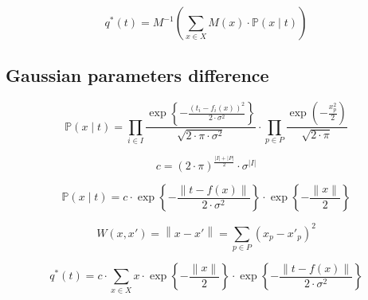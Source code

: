\begin{equation*}
  q^* \left( t \right)
  = M^{-1} \left(
      \sum_{x \in X} M\left( x \right) \cdot \mathbb{P}\left( x \mid t \right)
    \right)
\end{equation*}

\subsection{Gaussian parameters difference}

\begin{equation*}
  \mathbb{P}\left( x \mid t \right)
  = \prod_{i \in I}
    \frac{\exp{\left\{ - \frac{\left( t_i - f_i\left( x \right) \right)^2}
         {2 \cdot \sigma^2} \right\}}}{\sqrt{2 \cdot \pi \cdot \sigma^2}}
    \cdot
    \prod_{p \in P}
    \frac{\exp{\left( - \frac{x_p^2}{2} \right)}}{\sqrt{2 \cdot \pi}}
\end{equation*}

\begin{equation*}
  c = \left( 2 \cdot \pi \right)^{\frac{\left| I \right| + \left| P \right|}{2}}
      \cdot \sigma^{\left| I \right|}
\end{equation*}

\begin{equation*}
    \mathbb{P}\left( x \mid t \right)
    = c
      \cdot \exp{\left\{ - \frac{\left\| t - f\left( x \right) \right\|}
                                {2 \cdot \sigma^2} \right\}}
      \cdot \exp{\left\{ - \frac{\left\| x \right\|}{2} \right\}}
\end{equation*}

\begin{equation*}
  W \left( x, x' \right)
  = \left\| x - x' \right\|
  = \sum_{p \in P} \left( x_p - x'_p \right)^2
\end{equation*}

\begin{equation*}
  q^* \left( t \right)
  = c
    \cdot \sum_{x \in X}
      x
      \cdot \exp{\left\{ - \frac{\left\| x \right\|}{2} \right\}}
      \cdot \exp{\left\{ - \frac{\left\| t - f\left( x \right) \right\|}
                                {2 \cdot \sigma^2} \right\}}
\end{equation*}
